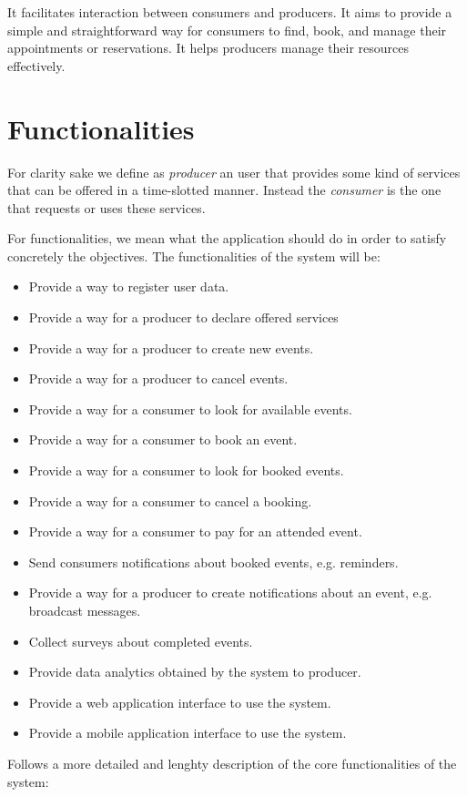\documentclass{article}
\begin{document}
It facilitates interaction between consumers and producers. It aims to provide
a simple and straightforward way for consumers to find, book, and manage their
appointments or reservations. It helps producers manage their resources
effectively.

\section{Functionalities}

For clarity sake we define as \emph{producer} an user that provides some
kind of services that can be offered in a time-slotted manner. Instead the
\emph{consumer} is the one that requests or uses these services.

For functionalities, we mean what the application should do in order to satisfy
concretely the objectives. The functionalities of the system will be:
\begin{itemize}
    \item Provide a way to register user data.
    \item Provide a way for a producer to declare offered services
    \item Provide a way for a producer to create new events.
    \item Provide a way for a producer to cancel events.
    \item Provide a way for a consumer to look for available events.
    \item Provide a way for a consumer to book an event.
    \item Provide a way for a consumer to look for booked events.
    \item Provide a way for a consumer to cancel a booking.
    \item Provide a way for a consumer to pay for an attended event.
    \item Send consumers notifications about booked events, e.g. reminders.
    \item Provide a way for a producer to create notifications about an event,
	e.g. broadcast messages. 
    \item Collect surveys about completed events.
    \item Provide data analytics obtained by the system to producer.
    \item Provide a web application interface to use the system.
    \item Provide a mobile application interface to use the system.
\end{itemize}
Follows a more detailed and lenghty description of the core functionalities
of the system:
\end{document}
